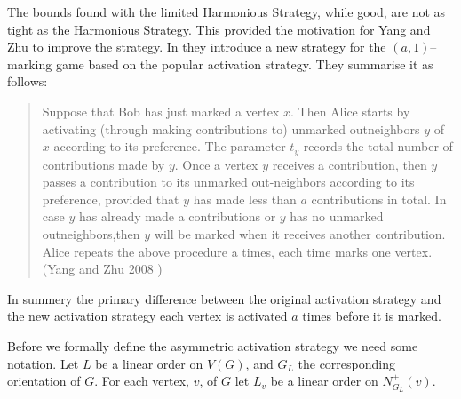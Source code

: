 The bounds found with the limited Harmonious Strategy, while good, are not as tight as the Harmonious Strategy. This provided the motivation for Yang and Zhu to improve the strategy. In \cite{yangZhu2008} they introduce a new strategy for the $(a,1)$--marking game based on the popular activation strategy. They summarise it as follows:

\begin{quotation}
    Suppose that Bob has just marked a vertex $x$. Then Alice starts by activating (through making contributions to) unmarked outneighbors $y$ of $x$ according to its preference. The parameter $t_y$ records the total number of contributions made by $y$. Once a vertex $y$ receives a contribution, then $y$ passes a contribution to its unmarked out-neighbors according to its preference, provided that $y$ has made less than $a$ contributions in total. In case $y$ has already made a contributions or $y$ has no unmarked outneighbors,then $y$ will be marked when it receives another contribution. Alice repeats the above procedure a times, each time marks one vertex. (Yang and Zhu 2008 \cite{yangZhu2008})
\end{quotation}

In summery the primary difference between the original activation strategy and the new activation strategy each vertex is activated $a$ times before it is marked.

Before we formally define the asymmetric activation strategy we need some notation. Let $L$ be a linear order on $V(G)$, and $G_L$ the corresponding orientation of $G$. For each vertex, $v$, of $G$ let $L_v$ be a linear order on $N^+_{G_L}(v)$. 

